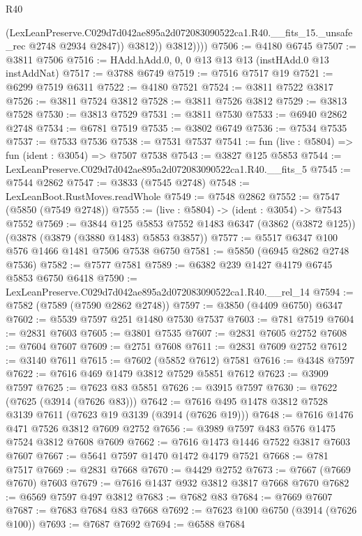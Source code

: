 \begin{lexlean}{R40}
\begin{coremodule}
                  (LexLeanPreserve.C029d7d042ae895a2d072083090522ca1.R40.__fits_15._unsafe_rec
                    @2748
                    @2934
                    @2847))
                @3812))
            @3812))))
@7506 := @4180 @6745
@7507 := @3811 @7506
@7516 := HAdd.hAdd.{0, 0, 0} @13 @13 @13 (instHAdd.{0} @13 instAddNat)
@7517 := @3788 @6749
@7519 := @7516 @7517 @19
@7521 := @6299 @7519 @6311
@7522 := @4180 @7521
@7524 := @3811 @7522 @3817
@7526 := @3811 @7524 @3812
@7528 := @3811 @7526 @3812
@7529 := @3813 @7528
@7530 := @3813 @7529
@7531 := @3811 @7530
@7533 := @6940 @2862 @2748
@7534 := @6781 @7519
@7535 := @3802 @6749
@7536 := @7534 @7535
@7537 := @7533 @7536
@7538 := @7531 @7537
@7541 := fun (live : @5804) => fun (ident : @3054) => @7507 @7538
@7543 := @3827 @125 @5853
@7544 := LexLeanPreserve.C029d7d042ae895a2d072083090522ca1.R40.__fits_5
@7545 := @7544 @2862
@7547 := @3833 (@7545 @2748)
@7548 := LexLeanBoot.RustMoves.readWhole
@7549 := @7548 @2862
@7552 := @7547 (@5850 (@7549 @2748))
@7555 := (live : @5804) -> (ident : @3054) -> @7543 @7552
@7569 := @3844
    @125
    @5853
    @7552
    @1483
    @6347
    (@3862 (@3872 @125))
    (@3878 (@3879 (@3880 @1483) @5853 @3857))
@7577 := @5517 @6347 @100 @576 @1466 @1481 @7506 @7538 @6750
@7581 := @5850 (@6945 @2862 @2748 @7536)
@7582 := @7577 @7581
@7589 := @6382 @239 @1427 @4179 @6745 @5853 @6750 @6418
@7590 := LexLeanPreserve.C029d7d042ae895a2d072083090522ca1.R40.__rel_14
@7594 := @7582 (@7589 (@7590 @2862 @2748))
@7597 := @3850 (@4409 @6750) @6347
@7602 := @5539 @7597 @251 @1480 @7530 @7537
@7603 := @781 @7519
@7604 := @2831 @7603
@7605 := @3801 @7535
@7607 := @2831 @7605 @2752
@7608 := @7604 @7607
@7609 := @2751 @7608
@7611 := @2831 @7609 @2752
@7612 := @3140 @7611
@7615 := @7602 (@5852 @7612) @7581
@7616 := @4348 @7597
@7622 := @7616 @469 @1479 @3812 @7529 @5851 @7612
@7623 := @3909 @7597
@7625 := @7623 @83 @5851
@7626 := @3915 @7597
@7630 := @7622 (@7625 (@3914 (@7626 @83)))
@7642 := @7616 @495 @1478 @3812 @7528 @3139 @7611 (@7623 @19 @3139 (@3914 (@7626 @19)))
@7648 := @7616 @1476 @471 @7526 @3812 @7609 @2752
@7656 := @3989 @7597 @483 @576 @1475 @7524 @3812 @7608 @7609
@7662 := @7616 @1473 @1446 @7522 @3817 @7603 @7607
@7667 := @5641 @7597 @1470 @1472 @4179 @7521
@7668 := @781 @7517
@7669 := @2831 @7668
@7670 := @4429 @2752
@7673 := @7667 (@7669 @7670) @7603
@7679 := @7616 @1437 @932 @3812 @3817 @7668 @7670
@7682 := @6569 @7597 @497 @3812
@7683 := @7682 @83
@7684 := @7669 @7607
@7687 := @7683 @7684 @83 @7668
@7692 := @7623 @100 @6750 (@3914 (@7626 @100))
@7693 := @7687 @7692
@7694 := @6588 @7684

\end{coremodule}
\end{lexlean}
